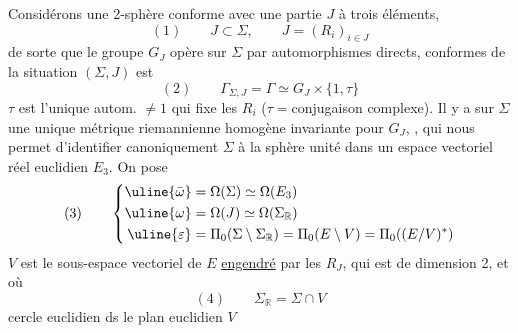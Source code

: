 Considérons une 2-sphère conforme \inserted{$\Sigma$} avec une partie $J$ à trois éléments,
\[
(1)\qquad J\subset\Sigma,\qquad J=(R_i)_{i\in J}
\]
de sorte que le groupe $G_J$ opère sur $\Sigma$ par automorphismes  directs,    conformes de la situation $(\Sigma,J)$ est
\[
(2)\qquad\Gamma_{\Sigma,J}=\Gamma\simeq G_J\times\{1,\tau\}
\]
$\tau$ est l'unique  autom. $\ne1$  qui fixe les $R_i$  ($\tau={}$conjugaison complexe).
Il y a sur $\Sigma$ une unique métrique riemannienne homogène invariante pour $G_J$,  , qui nous permet d'identifier canoniquement $\Sigma$ à la sphère unité dans un espace vectoriel réel euclidien $E_3$. On pose
\[
(3)\qquad\left\{\begin{aligned}
\uline{\bar\omega}&=\Omega(\Sigma)\simeq\Omega(E_3)\\
\uline{\omega}&=\Omega(J)\simeq\Omega(\Sigma_{\mathbb R})\\
\uline{\varepsilon}&=\Pi_0(\Sigma\setminus\Sigma_{\mathbb R})=\Pi_0(E\setminus V)=\Pi_0((E/V)^*)
\end{aligned}\right.
\]
$V$ est le sous-espace vectoriel de $E$ \uline{engendré} par les $R_J$, qui est de dimension 2, et où
\[
(4)\qquad\Sigma_{\mathbb R}=\Sigma\cap V
\]
cercle euclidien ds le plan euclidien $V$

